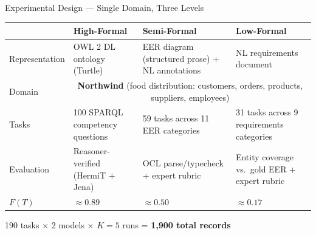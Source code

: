 \documentclass[aspectratio=169]{beamer}
\begin{document}
\begin{frame}{Experimental Design --- Single Domain, Three Levels}

\begin{table}
\centering
\small
\begin{tabular}{p{1.8cm}p{3.5cm}p{3.5cm}p{3.2cm}}
\toprule
& \textbf{\color{highformal}High-Formal} & \textbf{\color{semiformal!80!black}Semi-Formal} & \textbf{\color{lowformal}Low-Formal} \\
\midrule
Representation & OWL 2 DL ontology (Turtle) & EER diagram (structured prose) + NL annotations & NL requirements document \\[0.5em]
Domain & \multicolumn{3}{c}{\textbf{Northwind} (food distribution: customers, orders, products, suppliers, employees)} \\[0.5em]
Tasks & 100 SPARQL competency questions & 59 tasks across 11 EER categories & 31 tasks across 9 requirements categories \\[0.5em]
Evaluation & Reasoner-verified (HermiT + Jena) & OCL parse/typecheck + expert rubric & Entity coverage vs.\ gold EER + expert rubric \\[0.5em]
$F(T)$ & $\approx 0.89$ & $\approx 0.50$ & $\approx 0.17$ \\
\bottomrule
\end{tabular}
\end{table}

\vspace{0.3em}
\centering
{\small 190 tasks $\times$ 2 models $\times$ $K\!=\!5$ runs = \textbf{1,900 total records}}

\end{frame}
\end{document}
